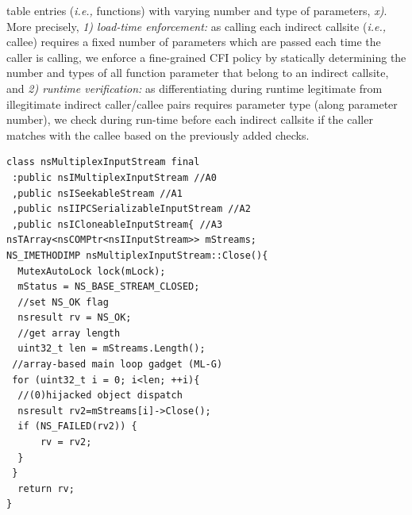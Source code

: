 table entries (\textit{i.e.,} functions) with varying number and type of parameters, \textit{x)}. More precisely, 
\textit{1) load-time enforcement:} as calling each indirect callsite (\textit{i.e.,} callee) requires a fixed number of parameters which are passed each time the caller is calling, 
we enforce a fine-grained CFI policy by statically determining the number and types of all function parameter that belong to an indirect callsite, and
\textit{2) runtime verification:} as differentiating during runtime legitimate from illegitimate indirect caller/callee pairs requires parameter type (along parameter number), we 
check during run-time before each indirect callsite if the caller matches with the callee based on the previously added checks.


\newsavebox{\firstlisting}
\begin{lrbox}{\firstlisting}
\begin{minipage}[c]{\linewidth}
\begin{verbatim}
class nsMultiplexInputStream final 
 :public nsIMultiplexInputStream //A0
 ,public nsISeekableStream //A1
 ,public nsIIPCSerializableInputStream //A2
 ,public nsICloneableInputStream{ //A3
nsTArray<nsCOMPtr<nsIInputStream>> mStreams;
NS_IMETHODIMP nsMultiplexInputStream::Close(){
  MutexAutoLock lock(mLock);
  mStatus = NS_BASE_STREAM_CLOSED;
  //set NS_OK flag
  nsresult rv = NS_OK;
  //get array length
  uint32_t len = mStreams.Length();
 //array-based main loop gadget (ML-G)
 for (uint32_t i = 0; i<len; ++i){
  //(0)hijacked object dispatch
  nsresult rv2=mStreams[i]->Close();
  if (NS_FAILED(rv2)) {
      rv = rv2;
  }
 }
  return rv;
}
\end{verbatim}
\end{minipage}
\end{lrbox}

